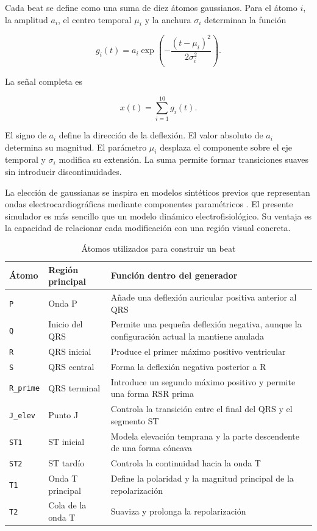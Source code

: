 Cada beat se define como una suma de diez átomos gaussianos. Para el átomo \(i\), la amplitud \(a_i\), el centro temporal \(\mu_i\) y la anchura \(\sigma_i\) determinan la función

\begin{equation}
g_i(t) =
a_i
\exp
\left(
-\frac{(t-\mu_i)^2}{2\sigma_i^2}
\right).
\label{eq:gaussian_atom_sim}
\end{equation}

La señal completa es

\begin{equation}
x(t) =
\sum_{i=1}^{10} g_i(t).
\label{eq:sum_gaussians}
\end{equation}

El signo de \(a_i\) define la dirección de la deflexión. El valor absoluto de \(a_i\) determina su magnitud. El parámetro \(\mu_i\) desplaza el componente sobre el eje temporal y \(\sigma_i\) modifica su extensión. La suma permite formar transiciones suaves sin introducir discontinuidades.

La elección de gaussianas se inspira en modelos sintéticos previos que representan ondas electrocardiográficas mediante componentes paramétricos \cite{sayadi2010}. El presente simulador es más sencillo que un modelo dinámico electrofisiológico. Su ventaja es la capacidad de relacionar cada modificación con una región visual concreta.

\begin{table}[H]
\centering
\small
\begin{tabularx}{\textwidth}{p{2.2cm} p{3.8cm} X}
\toprule
\textbf{Átomo} & \textbf{Región principal} & \textbf{Función dentro del generador} \\
\midrule
\texttt{P} & Onda P & Añade una deflexión auricular positiva anterior al QRS \\
\texttt{Q} & Inicio del QRS & Permite una pequeña deflexión negativa, aunque la configuración actual la mantiene anulada \\
\texttt{R} & QRS inicial & Produce el primer máximo positivo ventricular \\
\texttt{S} & QRS central & Forma la deflexión negativa posterior a R \\
\texttt{R\_prime} & QRS terminal & Introduce un segundo máximo positivo y permite una forma RSR prima \\
\texttt{J\_elev} & Punto J & Controla la transición entre el final del QRS y el segmento ST \\
\texttt{ST1} & ST inicial & Modela elevación temprana y la parte descendente de una forma cóncava \\
\texttt{ST2} & ST tardío & Controla la continuidad hacia la onda T \\
\texttt{T1} & Onda T principal & Define la polaridad y la magnitud principal de la repolarización \\
\texttt{T2} & Cola de la onda T & Suaviza y prolonga la repolarización \\
\bottomrule
\end{tabularx}
\caption{Átomos utilizados para construir un beat}
\label{tab:atomos}
\end{table}

